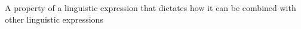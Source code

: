 A property of a linguistic expression that dictates how it can be combined with other linguistic expressions
